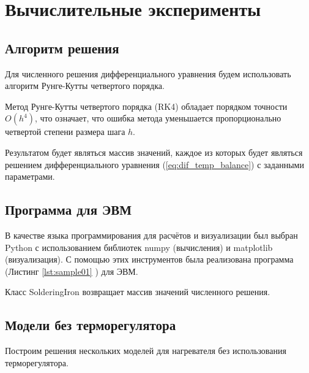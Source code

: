 \chapter{Вычислительные эксперименты}
\section{Алгоритм решения}

Для численного решения дифференциального уравнения будем использовать алгоритм Рунге-Кутты \cite{1964calculus} четвертого порядка. 

Метод Рунге-Кутты четвертого порядка (RK4) обладает порядком точности \( O(h^4) \), что означает, что ошибка метода уменьшается пропорционально четвертой степени размера шага \( h \).

Результатом будет являться массив значений, каждое из которых будет являться решением дифференциального уравнения (\ref{eq:dif_temp_balance}) с заданными параметрами.

\section{Программа для ЭВМ}

В качестве языка программирования для расчётов и визуализации был выбран Python с использованием библиотек numpy (вычисления) и matplotlib (визуализация). С помощью этих инструментов была реализована программа (Листинг \ref{lst:sample01} ) для ЭВМ.

 
%

Класс SolderingIron возвращает массив значений численного решения.

\newpage
\section{Модели без терморегулятора}

Построим решения нескольких моделей для нагревателя без использования терморегулятора.

